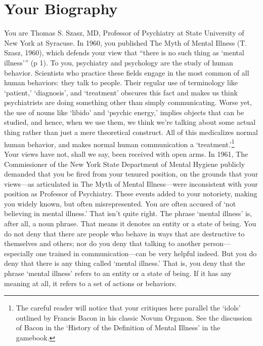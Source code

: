 \section{Your Biography}
\label{yourbiography}

You are Thomas S. Szasz, MD, Professor of Psychiatry at State University of New York at Syracuse.
In 1960, you published The Myth of Mental Illness (T. Szasz, 1960), which defends your view that “there is no such thing as ‘mental illness’” (p 1). To you, psychiatry and psychology are the study of human behavior. Scientists who practice these fields engage in the most common of all human behaviors: they talk to people. Their regular use of terminology like ‘patient,’ ‘diagnosis’, and ‘treatment’ obscures this fact and makes us think psychiatrists are doing something other than simply communicating. Worse yet, the use of nouns like ‘libido’ and ‘psychic energy,’ implies objects that can be studied, and hence, when we use them, we think we’re talking about some actual thing rather than just a mere theoretical construct. All of this medicalizes normal human behavior, and makes normal human communication a ‘treatment.’\footnote{The careful reader will notice that your critiques here parallel the `idols' outlined by Francis Bacon in his classic Novum Organon. See the discussion of Bacon in the `History of the Definition of Mental Illness' in the gamebook.}\\
Your views have not, shall we say, been received with open arms. In 1961, The Commissioner of the New York State Department of Mental Hygiene publicly demanded that you be fired from your tenured position, on the grounds that your views—as articulated in The Myth of Mental Illness—were inconsistent with your position as Professor of Psychiatry. These events added to your notoriety, making you widely known, but often misrepresented.
You are often accused of ‘not believing in mental illness.’ That isn’t quite right. The phrase ‘mental illness’ is, after all, a noun phrase. That means it denotes an entity or a state of being. You do not deny that there are people who behave in ways that are destructive to themselves and others; nor do you deny that talking to another person—especially one trained in communication—can be very helpful indeed. But you do deny that there is any thing called ‘mental illness.’ That is, you deny that the phrase ‘mental illness’ refers to an entity or a state of being. If it has any meaning at all, it refers to a set of actions or behaviors.
